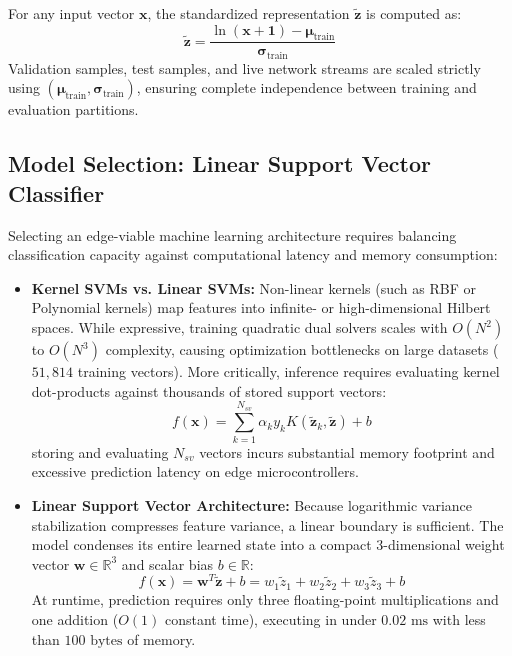 \documentclass[conference]{IEEEtran}
\begin{document}
For any input vector $\mathbf{x}$, the standardized representation $\tilde{\mathbf{z}}$ is computed as:
\begin{equation}
\tilde{\mathbf{z}} = \frac{\ln(\mathbf{x} + \mathbf{1}) - \boldsymbol{\mu}_{\text{train}}}{\boldsymbol{\sigma}_{\text{train}}}
\end{equation}
Validation samples, test samples, and live network streams are scaled strictly using $(\boldsymbol{\mu}_{\text{train}}, \boldsymbol{\sigma}_{\text{train}})$, ensuring complete independence between training and evaluation partitions.

\subsection{Model Selection: Linear Support Vector Classifier}
Selecting an edge-viable machine learning architecture requires balancing classification capacity against computational latency and memory consumption:
\begin{itemize}
    \item \textbf{Kernel SVMs vs. Linear SVMs:} Non-linear kernels (such as RBF or Polynomial kernels) map features into infinite- or high-dimensional Hilbert spaces. While expressive, training quadratic dual solvers scales with $O(N^2)$ to $O(N^3)$ complexity, causing optimization bottlenecks on large datasets ($51,814$ training vectors). More critically, inference requires evaluating kernel dot-products against thousands of stored support vectors:
    \begin{equation}
    f(\mathbf{x}) = \sum_{k=1}^{N_{sv}} \alpha_k y_k K(\tilde{\mathbf{z}}_k, \tilde{\mathbf{z}}) + b
    \end{equation}
    storing and evaluating $N_{sv}$ vectors incurs substantial memory footprint and excessive prediction latency on edge microcontrollers.
    \item \textbf{Linear Support Vector Architecture:} Because logarithmic variance stabilization compresses feature variance, a linear boundary is sufficient. The model condenses its entire learned state into a compact 3-dimensional weight vector $\mathbf{w} \in \mathbb{R}^3$ and scalar bias $b \in \mathbb{R}$:
    \begin{equation}
    f(\mathbf{x}) = \mathbf{w}^T \tilde{\mathbf{z}} + b = w_1 \tilde{z}_1 + w_2 \tilde{z}_2 + w_3 \tilde{z}_3 + b
    \end{equation}
    At runtime, prediction requires only three floating-point multiplications and one addition ($O(1)$ constant time), executing in under $0.02\text{ ms}$ with less than $100\text{ bytes}$ of memory.
\end{itemize}
\end{document}
